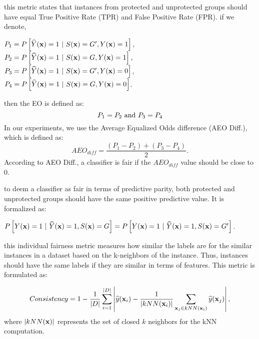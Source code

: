  this metric states that instances from protected and unprotected groups should have equal True Positive Rate (TPR) and False Positive Rate (FPR). 
if we denote, \\
\begin{center}
$P_1 = P\left[ \widehat{Y}({\bf x})=1\ |\ S({\bf x})=G', Y ({\bf x})=1 \right],$\\ 
$P_2 = P\left[ \widehat{Y}({\bf x})=1\ |\ S({\bf x})=G, Y({\bf x})=1 \right],$\\  
$P_3 = P\left[ \widehat{Y}({\bf x})=1\ |\ S({\bf x})=G', Y({\bf x})=0 \right]$, \\
$P_4 = P\left[ \widehat{Y}({\bf x})=1\ |\ S({\bf x})=G, Y({\bf x})=0 \right]$.\\
\end{center}
then the EO is defined as:
\begin{equation}\label{eq:eo}
P_1 = P_2\ \text{and}\ P_3 = P_4 \\
\end{equation}
In our experiments, we use the Average Equalized Odds difference (AEO Diff.), which is defined as:
\[
AEO_{diff} = \frac{(P_1 - P_2)+(P_3 - P_4)}{2}. 
\]
According to AEO Diff., a classifier is fair if the $AEO_{diff}$ value should be close to $0$.



 to deem a classifier as fair in terms of predictive parity, both protected and unprotected groups should have the same positive predictive value. It is formalized as:\\
\begin{small}
$P\left[Y({\bf x}) = 1\ |\ \widehat{Y}({\bf x})=1, S({\bf x})=G\right] = P\left[Y({\bf x}) = 1\ |\ \widehat{Y}({\bf x})=1, S({\bf x})=G'\right]$.
\end{small}

 this individual fairness metric measures how similar the labels are for the similar instances in a dataset based on the k-neighbors of the instance. Thus, instances should have the same labels if they are similar in terms of features. This metric is formulated as:


\[
Consistency = 1 - \frac{1}{|D|}\sum_{i=1}^{|D|} \left| \widehat{y}({\bf x}_i) -
           \frac{1}{\left|kNN({\bf x}_i)\right|} \sum_{{\bf x}_j\in kNN({\bf x}_i)} \widehat{y}({\bf x}_j) \right|,
\]
where $\left|kNN({\bf x})\right|$ represents the set of closed $k$ neighbors for the kNN computation.



